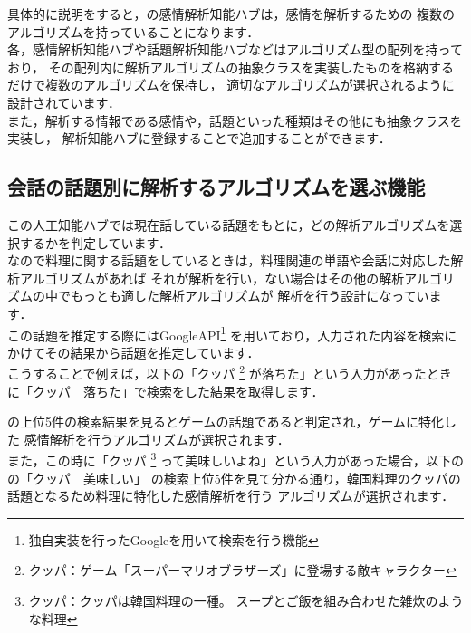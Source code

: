 
具体的に説明をすると，の感情解析知能ハブは，感情を解析するための
複数のアルゴリズムを持っていることになります．
\\
各，感情解析知能ハブや話題解析知能ハブなどはアルゴリズム型の配列を持っており，
その配列内に解析アルゴリズムの抽象クラスを実装したものを格納するだけで複数のアルゴリズムを保持し，
適切なアルゴリズムが選択されるように設計されています．
\\
また，解析する情報である感情や，話題といった種類はその他にも抽象クラスを実装し，
解析知能ハブに登録することで追加することができます．
\\

\subsection{会話の話題別に解析するアルゴリズムを選ぶ機能}
この人工知能ハブでは現在話している話題をもとに，どの解析アルゴリズムを選択するかを判定しています．\\
なので料理に関する話題をしているときは，料理関連の単語や会話に対応した解析アルゴリズムがあれば
それが解析を行い，ない場合はその他の解析アルゴリズムの中でもっとも適した解析アルゴリズムが
解析を行う設計になっています．
\\
この話題を推定する際にはGoogleAPI\footnote{独自実装を行ったGoogleを用いて検索を行う機能}
を用いており，入力された内容を検索にかけてその結果から話題を推定しています．
\\
こうすることで例えば，以下の「クッパ
	\footnote{クッパ：ゲーム「スーパーマリオブラザーズ」に登場する敵キャラクター}
が落ちた」という入力があったときに「クッパ　落ちた」で検索をした結果を取得します．


の上位5件の検索結果を見るとゲームの話題であると判定され，ゲームに特化した
感情解析を行うアルゴリズムが選択されます．\\

また，この時に「クッパ
	\footnote{クッパ：クッパは韓国料理の一種。 スープとご飯を組み合わせた雑炊のような料理}
って美味しいよね」という入力があった場合，以下のの「クッパ　美味しい」
の検索上位5件を見て分かる通り，韓国料理のクッパの話題となるため料理に特化した感情解析を行う
アルゴリズムが選択されます．

